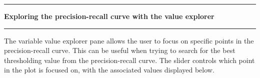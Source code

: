 \noindent\rule{\textwidth}{1pt}
\indent \textbf{Exploring the precision-recall curve with the value explorer}
\noindent\rule{\textwidth}{1pt}
\smallskip
\parbox{\textwidth}{The variable value explorer pane allows the user to focus on specific points in the precision-recall curve. This can be useful when trying to search for the best thresholding value from the precision-recall curve. The slider controls which point in the plot is focused on, with the associated values displayed below.}
